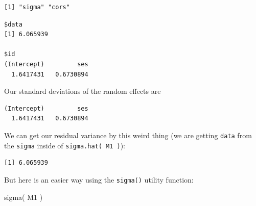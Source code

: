 \documentclass[
  letterpaper,
  DIV=11,
  numbers=noendperiod]{scrreprt}
\newenvironment{Shaded}{}{}
\newcommand{\FunctionTok}[1]{\textcolor[rgb]{0.02,0.16,0.49}{#1}}
\newcommand{\NormalTok}[1]{#1}
\newcommand{\SpecialCharTok}[1]{\textcolor[rgb]{0.25,0.44,0.63}{#1}}
\begin{document}
\begin{verbatim}
[1] "sigma" "cors" 
\end{verbatim}

\begin{Shaded}
\end{Shaded}

\begin{verbatim}
$data
[1] 6.065939

$id
(Intercept)         ses 
  1.6417431   0.6730894 
\end{verbatim}

Our standard deviations of the random effects are

\begin{Shaded}
\end{Shaded}

\begin{verbatim}
(Intercept)         ses 
  1.6417431   0.6730894 
\end{verbatim}

We can get our residual variance by this weird thing (we are getting
\texttt{data} from the \texttt{sigma} inside of
\texttt{sigma.hat(\ M1\ )}):

\begin{Shaded}
\end{Shaded}

\begin{verbatim}
[1] 6.065939
\end{verbatim}

But here is an easier way using the \texttt{sigma()} utility function:

\begin{Shaded}
\begin{Highlighting}[]
\FunctionTok{sigma}\NormalTok{( M1 )}
\end{Highlighting}
\end{Shaded}
\end{document}
